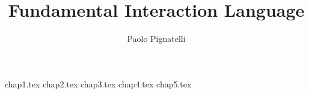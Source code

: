 \documentclass{book}
\begin{document}
\title{Fundamental Interaction Language}
\author{Paolo Pignatelli}
\maketitle

{chap1.tex}
{chap2.tex}   %
{chap3.tex}
{chap4.tex}
{chap5.tex}
\end{document}
